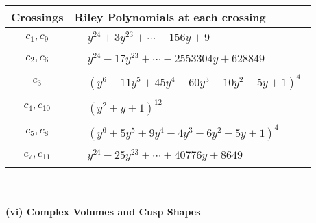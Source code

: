 \documentclass[1p]{elsarticle_modified}
\theoremstyle{definition}
\begin{document}
\begin{tabular}{m{50pt}|m{274pt}}
Crossings & \hspace{64pt}Riley Polynomials at each crossing \\
\hline $$\begin{aligned}c_{1},c_{9}\end{aligned}$$&$\begin{aligned}
&y^{24}+3 y^{23}+\cdots-156 y+9
\end{aligned}$\\
\hline $$\begin{aligned}c_{2},c_{6}\end{aligned}$$&$\begin{aligned}
&y^{24}-17 y^{23}+\cdots-2553304 y+628849
\end{aligned}$\\
\hline $$\begin{aligned}c_{3}\end{aligned}$$&$\begin{aligned}
&(y^6-11 y^5+45 y^4-60 y^3-10 y^2-5 y+1)^4
\end{aligned}$\\
\hline $$\begin{aligned}c_{4},c_{10}\end{aligned}$$&$\begin{aligned}
&(y^2+y+1)^{12}
\end{aligned}$\\
\hline $$\begin{aligned}c_{5},c_{8}\end{aligned}$$&$\begin{aligned}
&(y^6+5 y^5+9 y^4+4 y^3-6 y^2-5 y+1)^4
\end{aligned}$\\
\hline $$\begin{aligned}c_{7},c_{11}\end{aligned}$$&$\begin{aligned}
&y^{24}-25 y^{23}+\cdots+40776 y+8649
\end{aligned}$\\
\hline
\end{tabular}\\~\\
\newpage\flushleft \textbf{(vi) Complex Volumes and Cusp Shapes}
\end{document}
